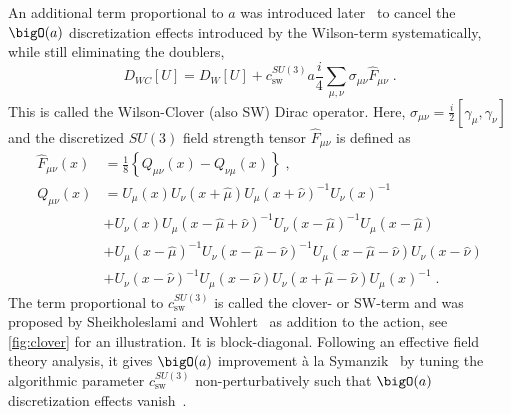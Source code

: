 An additional term proportional to $a$ was introduced later~\cite{sw1985} to cancel the $\bigO(a)$ discretization effects introduced by the Wilson-term systematically, while still eliminating the doublers,
\begin{equation} \label{eq:dirac:wilson:clover}
D_{WC}[U] = D_W[U] + c_\mathrm{sw}^{SU(3)} a \frac{i}{4} \sum_{\mu, \nu} \sigma_{\mu \nu} \hat{F}_{\mu \nu} \;.
\end{equation}
This is called the Wilson-Clover (also SW) Dirac operator.
Here, $\sigma_{\mu \nu} = \frac{i}{2} \left[\gamma_{\mu}, \gamma_{\nu}\right]$ and the discretized $SU(3)$ field strength tensor $\hat{F}_{\mu \nu}$ is defined as
\begin{align}
\hat{F}_{\mu \nu}(x) &= \frac{1}{8} \left\{
    Q_{\mu \nu}(x) - Q_{\nu \mu}(x)
\right\} \;, \label{eq:intro:clover} \\
Q_{\mu \nu}(x)
&= U_{\mu}(x)
   U_{\nu}(x+\hat{\mu})
   U_{\mu}(x+\hat{\nu})^{-1}
   U_{\nu}(x)^{-1} \label{eq:intro:clover:p1} \\
&+ U_{\nu}(x)
   U_{\mu}(x-\hat{\mu}+\hat{\nu})^{-1}
   U_{\nu}(x-\hat{\mu})^{-1}
   U_{\mu}(x-\hat{\mu}) \label{eq:intro:clover:p2} \\
&+ U_{\mu}(x-\hat{\mu})^{-1}
   U_{\nu}(x-\hat{\mu}-\hat{\nu})^{-1}
   U_{\mu}(x-\hat{\mu}-\hat{\nu})
   U_{\nu}(x-\hat{\nu}) \label{eq:intro:clover:p3} \\
&+ U_{\nu}(x-\hat{\nu})^{-1}
   U_{\mu}(x-\hat{\nu})
   U_{\nu}(x+\hat{\mu}-\hat{\nu})
   U_{\mu}(x)^{-1} \;. \label{eq:intro:clover:p4}
\end{align}
The term proportional to $c_\mathrm{sw}^{SU(3)}$ is called the clover- or SW-term and was proposed by Sheikholeslami and Wohlert~\cite{sw1985} as addition to the action, see \cref{fig:clover} for an illustration.
It is block-diagonal.
Following an effective field theory analysis, it gives $\bigO(a)$ improvement à la Symanzik~\cite{symanzik1982,SYMANZIK1983} by tuning the algorithmic parameter $c_\mathrm{sw}^{SU(3)}$ non-perturbatively such that $\bigO(a)$ discretization effects vanish~\cite{LUSCHER1996365}.

